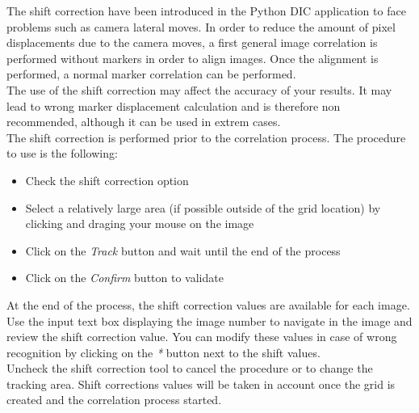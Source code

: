 \newline
\indent\indent The shift correction have been introduced in the Python DIC application to face problems such as camera lateral moves. In order to reduce the amount of pixel displacements due to the camera moves, a first general image correlation is performed without markers in order to align images. Once the alignment is performed, a normal marker correlation can be performed.\\
\newline
\indent The use of the shift correction may affect the accuracy of your results. It may lead to wrong marker displacement calculation and is therefore non recommended, although it can be used in extrem cases.\\
\newline
The shift correction is performed prior to the correlation process. The procedure to use is the following:
\begin{itemize}
  \item Check the shift correction option
  \item Select a relatively large area (if possible outside of the grid location) by clicking and draging your mouse on the image
  \item Click on the \textit{Track} button and wait until the end of the process
  \item Click on the \textit{Confirm} button to validate
\end{itemize}
\newline
\indent\indent At the end of the process, the shift correction values are available for each image. Use the input text box displaying the image number to navigate in the image and review the shift correction value. You can modify these values in case of wrong recognition by clicking on the \textit{*} button next to the shift values.\\
\newline
\indent Uncheck the shift correction tool to cancel the procedure or to change the tracking area. Shift corrections values will be taken in account once the grid is created and the correlation process started.
